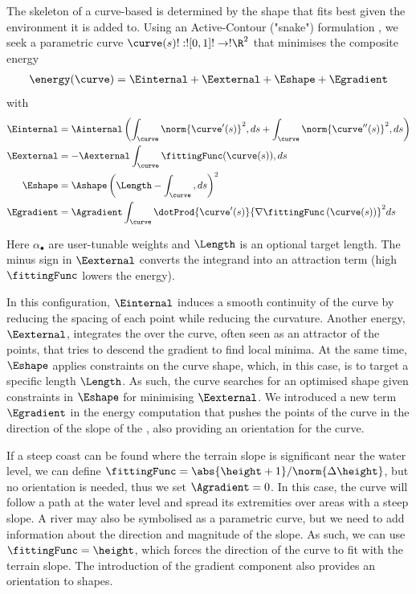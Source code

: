 The skeleton of a curve-based  is determined by the shape that fits best given the environment it is added to.
Using an Active-Contour ("snake") formulation \cite{Kass1988}, we seek a parametric curve $\curve(s)!:![0,1]!\to!\R^{2}$ that minimises the composite energy
\begin{align}
\energy(\curve) = \Einternal + \Eexternal + \Eshape + \Egradient
\end{align}
with
\begin{align}
    \label{eq:env-obj-snake-energy-equation-internal}
    \Einternal &= \Ainternal \left( \int_{\curve}{ \norm{\curve'(s)}^2 , ds} + \int_{\curve}{ \norm{\curve''(s)}^2 , ds} \right) \\
    \label{eq:env-obj-snake-energy-equation-external}
    \Eexternal &= -\Aexternal \int_{\curve}{ \fittingFunc(\curve(s)) , ds } \\
    \label{eq:env-obj-snake-energy-equation-shape}
    \Eshape &= \Ashape \left( \Length - \int_{\curve}{ , ds } \right)^2 \\
    \label{eq:env-obj-snake-energy-equation-gradient}
    \Egradient &= \Agradient \int_{\curve}{\dotProd{\curve'(s)}{\nabla\fittingFunc\left(\curve(s)\right)}^2 ds}
\end{align}

Here $\alpha_{\bullet}$ are user-tunable weights and $\Length$ is an optional target length. The minus sign in $\Eexternal$ converts the integrand into an attraction term (high $\fittingFunc$ lowers the energy).

In this configuration, $\Einternal$ induces a smooth continuity of the curve by reducing the spacing of each point while reducing the curvature. Another energy, $\Eexternal$, integrates the  over the curve, often seen as an attractor of the points, that tries to descend the gradient to find local minima. At the same time, $\Eshape$ applies constraints on the curve shape, which, in this case, is to target a specific length $\Length$. As such, the curve searches for an optimised shape given constraints in $\Eshape$ for minimising $\Eexternal$. We introduced a new term $\Egradient$ in the energy computation that pushes the points of the curve in the direction of the slope of the , also providing an orientation for the curve.

If a steep coast can be found where the terrain slope is significant near the water level, we can define $\fittingFunc = \abs{\height + 1} / \norm{\Delta \height}$, but no orientation is needed, thus we set $\Agradient = 0$. In this case, the curve will follow a path at the water level and spread its extremities over areas with a steep slope. A river may also be symbolised as a parametric curve, but we need to add information about the direction and magnitude of the slope. As such, we can use $\fittingFunc = \height$, which forces the direction of the curve to fit with the terrain slope. The introduction of the gradient component also provides an orientation to shapes.


